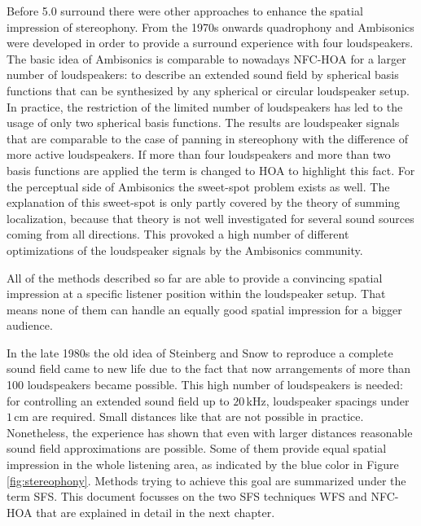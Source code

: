 Before 5.0 surround there were other approaches to enhance the spatial impression of
stereophony. From the 1970s onwards quadro\-phony and
Ambisonics\autocite{Gerzon1973} were developed in
order to provide a surround experience with four loudspeakers. The basic idea of
Ambisonics is comparable to nowadays \ac{NFC-HOA} for
a larger number of loudspeakers: to describe an extended sound field by spherical
basis functions that can be synthesized by any spherical or circular loudspeaker
setup. In practice, the restriction of the limited number of loudspeakers has led to the usage
of only two spherical basis functions. The results are
loudspeaker signals that are comparable to the case of panning in
stereophony with the difference of more active
loudspeakers.\autocite[E.g.][]{Frank2013}
If more than four loudspeakers and more than two basis functions
are applied the term is changed to \ac{HOA} to highlight this fact.
For the perceptual side of Ambisonics the sweet-spot problem exists as well.
The explanation of this sweet-spot is only partly covered by the
theory of summing localization, because that theory is not well investigated for
several sound sources coming from all directions. This provoked a high number of
different optimizations of the loudspeaker signals by the Ambisonics community.


All of the methods described so far are able to provide a
convincing spatial impression at a specific listener position within the
loudspeaker setup. That means none of them can handle an equally good spatial
impression for a bigger audience.

In the late 1980s the old idea of Steinberg and Snow to reproduce a
complete sound field came to new life due to the fact that now arrangements of
more than 100 loudspeakers became possible.\autocite{Berkhout1988}
This high number of loudspeakers is needed: for controlling an extended
sound field up to $20$\,kHz, loudspeaker spacings under $1$\,cm
are required. Small distances like that are not possible in practice. Nonetheless,
the experience has shown that even with larger distances reasonable sound field
approximations are possible. Some of them provide equal spatial impression in the
whole listening area, as indicated by the blue color in Figure\,\ref{fig:stereophony}.
Methods trying to achieve this goal are summarized under the term \acf{SFS}.
This document focusses on the two \ac{SFS} techniques \ac{WFS} and \ac{NFC-HOA}
that are explained in detail in the next chapter.



